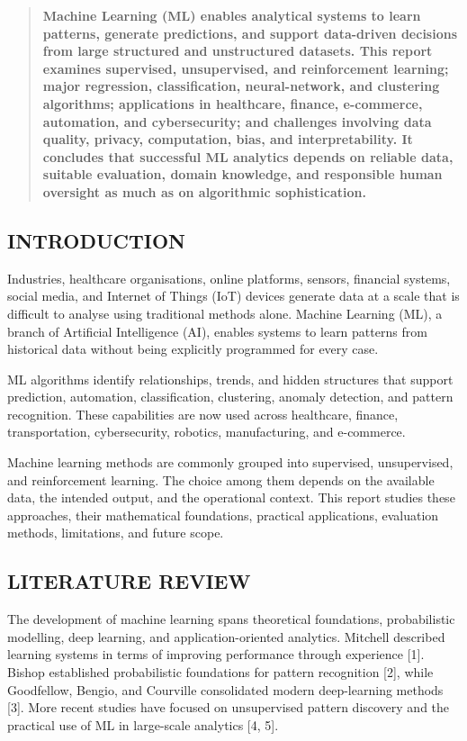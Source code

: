 \begin{multicols}{2}
  \begin{abstract}
    \bfseries
    Machine Learning (ML) enables analytical systems to learn patterns, generate predictions, and support data-driven decisions from large structured and unstructured datasets. This report examines supervised, unsupervised, and reinforcement learning; major regression, classification, neural-network, and clustering algorithms; applications in healthcare, finance, e-commerce, automation, and cybersecurity; and challenges involving data quality, privacy, computation, bias, and interpretability. It concludes that successful ML analytics depends on reliable data, suitable evaluation, domain knowledge, and responsible human oversight as much as on algorithmic sophistication.
  \end{abstract}

  \subsection*{\centering\uppercase{Introduction}}
  Industries, healthcare organisations, online platforms, sensors, financial systems, social media, and Internet of Things (IoT) devices generate data at a scale that is difficult to analyse using traditional methods alone. Machine Learning (ML), a branch of Artificial Intelligence (AI), enables systems to learn patterns from historical data without being explicitly programmed for every case.

  \noindent
  ML algorithms identify relationships, trends, and hidden structures that support prediction, automation, classification, clustering, anomaly detection, and pattern recognition. These capabilities are now used across healthcare, finance, transportation, cybersecurity, robotics, manufacturing, and e-commerce.

   \noindent
  Machine learning methods are commonly grouped into supervised, unsupervised, and reinforcement learning. The choice among them depends on the available data, the intended output, and the operational context. This report studies these approaches, their mathematical foundations, practical applications, evaluation methods, limitations, and future scope.

  \subsection*{\centering\uppercase{Literature Review}}
  The development of machine learning spans theoretical foundations, probabilistic modelling, deep learning, and application-oriented analytics. Mitchell described learning systems in terms of improving performance through experience [1]. Bishop established probabilistic foundations for pattern recognition [2], while Goodfellow, Bengio, and Courville consolidated modern deep-learning methods [3]. More recent studies have focused on unsupervised pattern discovery and the practical use of ML in large-scale analytics [4, 5].


\end{multicols}
